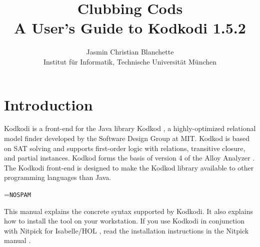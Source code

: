 \documentclass[a4paper,12pt]{article}
\begin{document}
\title{Clubbing Cods \\[\smallskipamount]
\Large A User's Guide to Kodkodi 1.5.2}
\author{Jasmin Christian Blanchette \\
{\normalsize Institut f\"ur Informatik, Technische Universit\"at M\"unchen}}

\maketitle

\tableofcontents

\setlength{\parskip}{.7em plus .2em minus .1em}
\setlength{\parindent}{0pt}
\setlength{\abovedisplayskip}{\parskip}
\setlength{\abovedisplayshortskip}{.9\parskip}
\setlength{\belowdisplayskip}{\parskip}
\setlength{\belowdisplayshortskip}{.9\parskip}

\newenvironment{enum}%
    {\begin{list}{}{%
        \setlength{\topsep}{.1\parskip}%
        \setlength{\partopsep}{.1\parskip}%
        \setlength{\itemsep}{\parskip}%
        \advance\itemsep by-\parsep}}
    {\end{list}}

\def\pre{\begingroup\vskip0pt plus1ex\advance\leftskip by\leftmargin
\advance\rightskip by\leftmargin}
\def\post{\vskip0pt plus1ex\endgroup}

\def\prew{\pre\advance\rightskip by-\leftmargin}
\def\postw{\post}

\def\cpp{C\nobreak\raisebox{.1ex}{+}\nobreak\raisebox{.1ex}{+}}

\section{Introduction}
\label{introduction}

Kodkodi is a front-end for the Java library Kodkod \cite{torlak-jackson-2007}, a
highly-optimized relational model finder developed by the Software Design Group
at MIT. Kodkod is based on SAT solving and supports first-order logic with
relations, transitive closure, and partial instances. Kodkod forms the basis of
version 4 of the Alloy Analyzer \cite{jackson-2006}. The Kodkodi
front-end is designed to make the Kodkod library available to other programming
languages than Java.

\newbox\boxA
\setbox\boxA=\hbox{\texttt{NOSPAM}}

This manual explains the concrete syntax supported by Kodkodi. It also explains
how to install the tool on your workstation. If you use Kodkodi in conjunction
with Nitpick for Isabelle/HOL \cite{nitpick-2009}, read the installation
instructions in the Nitpick manual \cite{blanchette-2009}.
\end{document}
